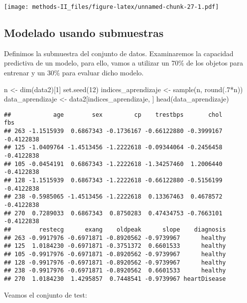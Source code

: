 \documentclass[
]{article}
\newenvironment{Shaded}{\begin{snugshade}}{\end{snugshade}}
\newcommand{\DecValTok}[1]{\textcolor[rgb]{0.00,0.00,0.81}{#1}}
\newcommand{\FunctionTok}[1]{\textcolor[rgb]{0.00,0.00,0.00}{#1}}
\newcommand{\NormalTok}[1]{#1}
\newcommand{\OtherTok}[1]{\textcolor[rgb]{0.56,0.35,0.01}{#1}}
\newcommand{\SpecialCharTok}[1]{\textcolor[rgb]{0.00,0.00,0.00}{#1}}
\begin{document}
\texttt{[image: methods-II\_files/figure-latex/unnamed-chunk-27-1.pdf]}

\hypertarget{modelado-usando-submuestras}{%
\subsection{Modelado usando
submuestras}\label{modelado-usando-submuestras}}

Definimos la submuestra del conjunto de datos. Examinaremos la capacidad
predictiva de un modelo, para ello, vamos a utilizar un 70\% de los
objetos para entrenar y un 30\% para evaluar dicho modelo.

\begin{Shaded}
\begin{Highlighting}[]
\NormalTok{n }\OtherTok{\textless{}{-}} \FunctionTok{dim}\NormalTok{(data2)[}\DecValTok{1}\NormalTok{]}
\FunctionTok{set.seed}\NormalTok{(}\DecValTok{12}\NormalTok{)}
\NormalTok{indices\_aprendizaje }\OtherTok{\textless{}{-}} \FunctionTok{sample}\NormalTok{(n, }\FunctionTok{round}\NormalTok{(.}\DecValTok{7}\SpecialCharTok{*}\NormalTok{n))}
\NormalTok{data\_aprendizaje }\OtherTok{\textless{}{-}}\NormalTok{ data2[indices\_aprendizaje, ]}
\FunctionTok{head}\NormalTok{(data\_aprendizaje)}
\end{Highlighting}
\end{Shaded}

\begin{verbatim}
##            age        sex         cp    trestbps       chol        fbs
## 263 -1.1515939  0.6867343 -0.1736167 -0.66122880 -0.3999167 -0.4122838
## 125 -1.0409764 -1.4513456 -1.2222618 -0.09344064 -0.2456458 -0.4122838
## 105 -0.0454191  0.6867343 -1.2222618 -1.34257460  1.2006440 -0.4122838
## 128 -1.1515939  0.6867343 -1.2222618 -0.66122880 -0.5156199 -0.4122838
## 238 -0.5985065 -1.4513456 -1.2222618  0.13367463  0.4678572 -0.4122838
## 270  0.7289033  0.6867343  0.8750283  0.47434753 -0.7663101 -0.4122838
##        restecg      exang    oldpeak      slope    diagnosis
## 263 -0.9917976 -0.6971871 -0.8920562 -0.9739967      healthy
## 125  1.0184230 -0.6971871 -0.3751372  0.6601533      healthy
## 105 -0.9917976 -0.6971871 -0.8920562 -0.9739967      healthy
## 128 -0.9917976 -0.6971871 -0.8920562 -0.9739967      healthy
## 238 -0.9917976 -0.6971871 -0.8920562  0.6601533      healthy
## 270  1.0184230  1.4295857  0.7448541 -0.9739967 heartDisease
\end{verbatim}

Veamos el conjunto de test:
\end{document}
